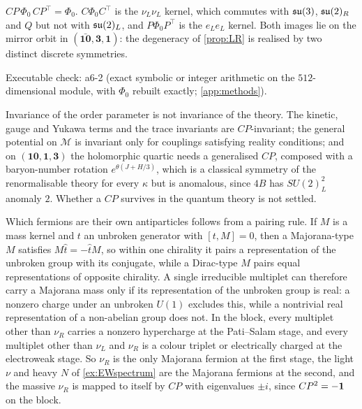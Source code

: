 \begin{theorem}
\label{thm:vacCP}
$CP\,\Phi_0\,CP^{\!\top}=\Phi_0$. $C\Phi_0C^{\!\top}$ is the $\nu_L\nu_L$ kernel, which commutes with $\mathfrak{su}(3)$, $\mathfrak{su}(2)_R$ and $Q$ but not with $\mathfrak{su}(2)_L$, and
$P\Phi_0P^{\!\top}$ is the $e_Le_L$ kernel. Both images lie on the mirror orbit in $(\bar{\mathbf{10}},\mathbf3,\mathbf1)$: the degeneracy of \cref{prop:LR} is realised by two distinct
discrete symmetries.
\end{theorem}

\noindent Executable check: a6-2 (exact symbolic or integer arithmetic on the $512$-dimensional module, with $\Phi_0$ rebuilt exactly; \cref{app:methods}).

Invariance of the order parameter is not invariance of the theory. The kinetic, gauge and Yukawa terms and the trace invariants are $CP$-invariant; the general
potential on $\mathcal M$ is invariant only for couplings satisfying reality conditions; and on $(\mathbf{10},\mathbf1,\mathbf3)$ the holomorphic quartic needs a generalised $CP$,
composed with a baryon-number rotation $e^{\theta(J+H/3)}$, which is a classical symmetry of the renormalisable theory for every $\kappa$ but is anomalous, since $4B$
has $SU(2)_L^2$ anomaly $2$. Whether a $CP$ survives in the quantum theory is not settled.

Which fermions are their own antiparticles follows from a pairing rule. If $M$ is a mass kernel and $t$ an unbroken generator with $[t,M]=0$, then a Majorana-type $M$
satisfies $M\hat t=-\hat tM$, so within one chirality it pairs a representation of the unbroken group with its conjugate, while a Dirac-type $M$ pairs equal
representations of opposite chirality. A single irreducible multiplet can therefore carry a Majorana mass only if its representation of the unbroken group is
real: a nonzero charge under an unbroken $U(1)$ excludes this, while a nontrivial real representation of a non-abelian group does not. In the block, every multiplet
other than $\nu_R$ carries a nonzero hypercharge at the Pati--Salam stage, and every multiplet other than $\nu_L$ and $\nu_R$ is a colour triplet or electrically
charged at the electroweak stage. So $\nu_R$ is the only Majorana fermion at the first stage, the light $\nu$ and heavy $N$ of \cref{ex:EWspectrum} are the
Majorana fermions at the second, and the massive $\nu_R$ is mapped to itself by $CP$ with eigenvalues $\pm i$, since $CP^2=-\mathbf 1$ on the block.

